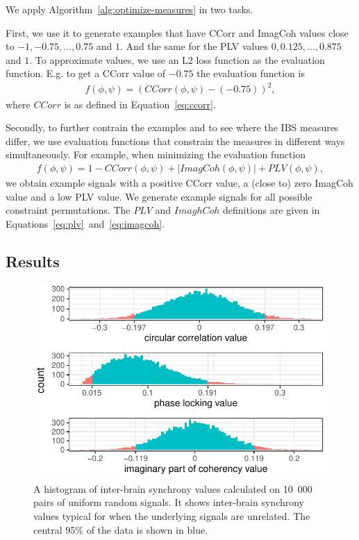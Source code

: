 We apply Algorithm~\ref{alg:optimize-measures} in two tasks.

First, we use it to generate examples that have CCorr and ImagCoh values close
to $-1, -0.75, \ldots, 0.75$ and $1$. And the same for the PLV values
$0, 0.125, \ldots, 0.875$ and $1$. To approximate values, we use an L2 loss
function as the evaluation function. E.g. to get a CCorr value of
$-0.75$ the evaluation function is
\begin{align}
  f(\phi, \psi) = \left(CCorr(\phi, \psi) - (-0.75)\right)^2,
\end{align}
where $CCorr$ is as defined in Equation~\ref{eq:ccorr}.

Secondly, to further contrain the examples and to see where the IBS measures
differ, we use evaluation functions that constrain the measures in different
ways simultaneously. For example, when minimizing the evaluation function
\begin{align}
  f(\phi, \psi) = 1 - CCorr(\phi, \psi) + |ImagCoh(\phi, \psi)| + PLV(\phi, \psi),
\end{align}
we obtain example signals with a positive CCorr value, a (close to) zero
ImagCoh value and a low PLV value. We generate example signals for all possible
constraint permutations. The $PLV$ and $ImaghCoh$ definitions are given in
Equations~\ref{eq:plv}~and~\ref{eq:imagcoh}.

\subsection{Results}

\begin{figure}[!htpb]
  \includegraphics[width=\linewidth]{../stats/results/simulation_null.pdf}
  \caption{A histogram of inter-brain synchrony values calculated on 10~000 pairs of uniform random signals. It shows inter-brain synchrony values typical for when the underlying signals are unrelated. The central 95\% of the data is shown in blue.}
  \label{fig:simulation_null}
\end{figure}

